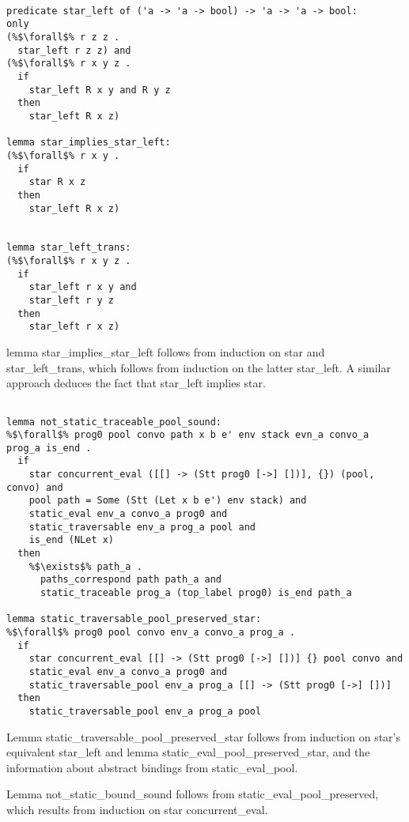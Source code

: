 \documentclass{article}
\begin{document}
\begin{lstlisting}[language=logic, style=codestyle1, escapechar=\%]

predicate star_left of ('a -> 'a -> bool) -> 'a -> 'a -> bool:
only
(%$\forall$% r z z .
  star_left r z z) and
(%$\forall$% r x y z .
  if
    star_left R x y and R y z
  then
    star_left R x z)

lemma star_implies_star_left:
(%$\forall$% r x y .
  if
    star R x z
  then
    star_left R x z)


lemma star_left_trans:
(%$\forall$% r x y z .
  if 
    star_left r x y and
    star_left r y z 
  then
    star_left r x z)

\end{lstlisting}

lemma star\_implies\_star\_left follows from induction on star and star\_left\_trans,
which follows from induction on the latter star\_left.  A similar approach deduces the
fact that star\_left implies star.

\begin{lstlisting}[language=logic, style=codestyle1, escapechar=\%]

lemma not_static_traceable_pool_sound:
%$\forall$% prog0 pool convo path x b e' env stack evn_a convo_a prog_a is_end .
  if
    star concurrent_eval ([[] -> (Stt prog0 [->] [])], {}) (pool, convo) and 
    pool path = Some (Stt (Let x b e') env stack) and 
    static_eval env_a convo_a prog0 and 
    static_traversable env_a prog_a pool and 
    is_end (NLet x)
  then
    %$\exists$% path_a . 
      paths_correspond path path_a and 
      static_traceable prog_a (top_label prog0) is_end path_a

lemma static_traversable_pool_preserved_star:
%$\forall$% prog0 pool convo env_a convo_a prog_a .
  if
    star concurrent_eval [[] -> (Stt prog0 [->] [])] {} pool convo and 
    static_eval env_a convo_a prog0 and
    static_traversable_pool env_a prog_a [[] -> (Stt prog0 [->] [])]
  then
    static_traversable_pool env_a prog_a pool 

\end{lstlisting}


Lemma static\_traversable\_pool\_preserved\_star follows from induction on star's equivalent
star\_left and lemma static\_eval\_pool\_preserved\_star, and the information about abstract
bindings from static\_eval\_pool.


Lemma not\_static\_bound\_sound follows from static\_eval\_pool\_preserved, which results from
induction on star concurrent\_eval.
\end{document}
